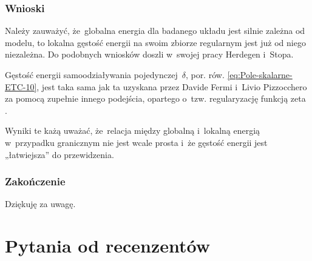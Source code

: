 \documentclass[10pt,t]{beamer}
\begin{document}
\begin{frame}
  \frametitle{Wnioski}


  Należy zauważyć, że~\alert{globalna} energia dla badanego układu
  jest silnie zależna od modelu, to \alert{lokalna gęstość energii}
  na swoim zbiorze regularnym jest już od niego \alert{niezależna}.
  Do podobnych wniosków doszli w~swojej pracy Herdegen i~Stopa.

  Gęstość energii samoodziaływania pojedynczej~$\delta$, por.
  rów. \eqref{eq:Pole-skalarne-ETC-10}, jest taka sama jak ta uzyskana
  przez  Davide Fermi i~Livio Pizzocchero za pomocą zupełnie innego
  podejścia, opartego o~tzw. regularyzację funkcją zeta
  \parencite{Fermi-Pizzocchero-Local-Casimir-Effect-for-a-Scalar-ETC-2018}.

  Wyniki te każą uważać, że~relacja między globalną i~lokalną energią
  w~przypadku granicznym nie jest wcale prosta i~że gęstość energii jest
  „łatwiejsza” do przewidzenia.

\end{frame}





\begin{frame}
  \frametitle{Zakończenie}

  \vspace{7em}


  \begin{center}

    \Large

    Dziękuję za uwagę.

  \end{center}

\end{frame}







\appendix





\section{Pytania od recenzentów}
\end{document}
